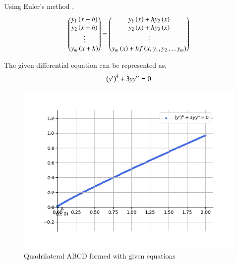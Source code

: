 \documentclass[journal]{IEEEtran}
\begin{document}
Using Euler's method ,
\begin{align}
    \begin{pmatrix}y_1\left(x + h\right)\\y_2\left(x + h\right)\\\vdots\\y_m\left(x + h\right)\end{pmatrix} = \begin{pmatrix}y_1\left(x\right) + hy_2\left(x\right)\\y_2\left(x\right) + hy_3\left(x\right)\\\vdots\\y_m\left(x\right) + hf\left(x, y_1, y_2 \dots y_m\right)\end{pmatrix}
\end{align}

The given differential equation can be represented as,
\begin{align}
    \left(y^{\prime}\right)^4 + 3yy^{\prime\prime} = 0
\end{align}

\begin{figure}[h!]
   \centering
   \includegraphics[width=0.7\linewidth]{figs/graph.png}
   \caption{Quadrilateral ABCD formed with given equations}
   \label{label}
\end{figure}
\end{document}
